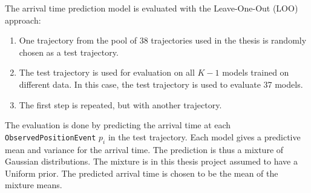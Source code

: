 The arrival time prediction model is evaluated with the Leave-One-Out (LOO) approach:
\begin{enumerate}
    \item One trajectory from the pool of 38 trajectories used in the thesis is randomly chosen as a test trajectory.
    \item The test trajectory is used for evaluation on all $K-1$ models trained on different data.
    In this case, the test trajectory is used to evaluate 37 models.
    \item The first step is repeated, but with another trajectory.
\end{enumerate}

The evaluation is done by predicting the arrival time at each \texttt{ObservedPositionEvent} $p_i$ in the test trajectory.
Each model gives a predictive mean and variance for the arrival time.
The prediction is thus a mixture of Gaussian distributions.
The mixture is in this thesis project assumed to have a Uniform prior.
The predicted arrival time is chosen to be the mean of the mixture means.

